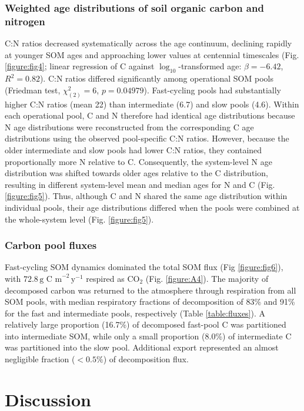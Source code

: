 \documentclass[bg, manuscript]{copernicus}
\begin{document}
\subsubsection{Weighted age distributions of soil organic carbon and nitrogen}
C:N ratios decreased systematically across the age continuum, declining rapidly at younger SOM ages and approaching lower values at centennial timescales (Fig. \ref{figure:fig4}; linear regression of C against $\log_{10}$-transformed age: $\beta = -6.42$, $R^2 = 0.82$). C:N ratios differed significantly among operational SOM pools (Friedman test, $\chi^2_{(2)} = 6$, $p = 0.04979$). Fast-cycling pools had substantially higher C:N ratios (mean 22) than intermediate (6.7) and slow pools (4.6). Within each operational pool, C and N therefore had identical age distributions because N age distributions were reconstructed from the corresponding C age distributions using the observed pool-specific C:N ratios. However, because the older intermediate and slow pools had lower C:N ratios, they contained proportionally more N relative to C. Consequently, the system-level N age distribution was shifted towards older ages relative to the C distribution, resulting in different system-level mean and median ages for N and C (Fig. \ref{figure:fig5}). Thus, although C and N shared the same age distribution within individual pools, their age distributions differed when the pools were combined at the whole-system level (Fig. \ref{figure:fig5}).

\subsubsection{Carbon pool fluxes}
Fast-cycling SOM dynamics dominated the total SOM flux (Fig \ref{figure:fig6}), with $72.8\,\text{g C m}^{-2}\,\text{y}^{-1}$ respired as $\text{CO}_2$ (Fig. \ref{figure:A4}). The majority of decomposed carbon was returned to the atmosphere through respiration from all SOM pools, with median respiratory fractions of decomposition of 83\% and 91\% for the fast and intermediate pools, respectively (Table \ref{table:fluxes}). A relatively large proportion (16.7\%) of decomposed fast-pool C was partitioned into intermediate SOM, while only a small proportion (8.0\%) of intermediate C was partitioned into the slow pool. Additional export represented an almost negligible fraction ($< 0.5\%$) of decomposition flux.

\section{Discussion}
\end{document}
